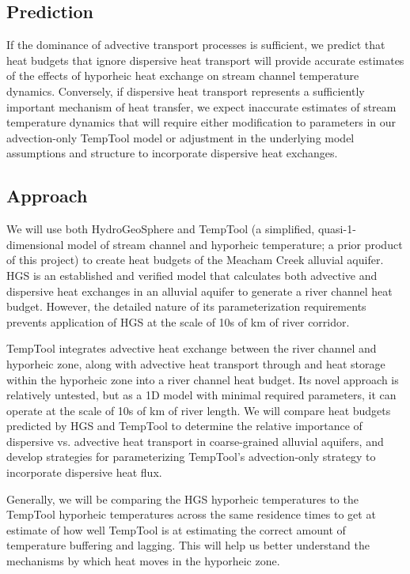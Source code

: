 \documentclass[a4paper]{article}
\begin{document}
\subsection*{Prediction}
If the dominance of advective transport processes is sufficient, we predict that heat budgets that ignore dispersive heat transport will provide accurate estimates of the effects of hyporheic heat exchange on stream channel temperature dynamics. Conversely, if dispersive heat transport represents a sufficiently important mechanism of heat transfer, we expect inaccurate estimates of stream temperature dynamics that will require either modification to parameters in our advection-only TempTool model or adjustment in the underlying model assumptions and structure to incorporate dispersive heat exchanges.




\subsection*{Approach}
We will use both HydroGeoSphere and TempTool (a simplified, quasi-1-dimensional model of stream channel and hyporheic temperature; a prior product of this project) to create heat budgets of the Meacham Creek alluvial aquifer. HGS is an established and verified model that calculates both advective and dispersive heat exchanges in an alluvial aquifer to generate a river channel heat budget. However, the detailed nature of its parameterization requirements prevents application of HGS at the scale of 10s of km of river corridor. 

TempTool integrates advective heat exchange between the river channel and hyporheic zone, along with advective heat transport through and heat storage within the hyporheic zone into a river channel heat budget.  Its novel approach is relatively untested, but as a 1D model with minimal required parameters, it can operate at the scale of 10s of km of river length.  We will compare heat budgets predicted by HGS and TempTool to determine the relative importance of dispersive vs. advective heat transport in coarse-grained alluvial aquifers, and develop strategies for parameterizing TempTool’s advection-only strategy to incorporate dispersive heat flux. 

Generally, we will be comparing the HGS hyporheic temperatures to the TempTool hyporheic temperatures across the same residence times to get at estimate of how well TempTool is at estimating the correct amount of temperature buffering and lagging. This will help us better understand the mechanisms by which heat moves in the hyporheic zone. 


\printbibliography
\end{document}
